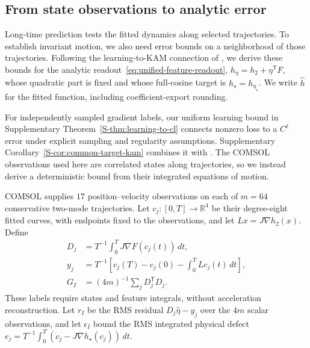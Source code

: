 \subsection{From state observations to analytic error}
\label{core-sec-learning-kam}
Long-time prediction tests the fitted dynamics along selected trajectories.
To establish invariant motion, we also need error bounds on a neighborhood
of those trajectories. Following the learning-to-KAM connection of
\citet[Theorem~11]{chen2022}, we derive these bounds for the analytic
readout~\eqref{eq:unified-feature-readout},
$h_\eta=h_2+\eta^{\mathsf T}F$, whose quadratic part is fixed and whose
full-cosine target is $h_\star=h_{\eta_\star}$. We write $\widehat h$ for
the fitted function, including coefficient-export rounding.

For independently sampled gradient labels, our uniform learning bound
in Supplementary Theorem~\ref{S-thm:learning-to-cl} connects nonzero loss
to a $C^\ell$ error under explicit sampling and regularity assumptions.
Supplementary Corollary~\ref{S-cor:common-target-kam} combines it with
\citet[Theorem~A]{bounemoura}. The COMSOL observations used here are
correlated states along trajectories, so we instead derive a deterministic
bound from their integrated equations of motion.

COMSOL supplies $17$ position--velocity observations on each of $m=64$
conservative two-mode trajectories. Let $c_j:[0,T]\to\mathbb R^4$ be
their degree-eight fitted curves, with endpoints fixed to the observations,
and let $Lx=J\nabla h_2(x)$. Define
\begin{equation}
 \begin{aligned}
  D_j&=T^{-1}\int_0^T J\nabla F(c_j(t))\,dt,\\
  y_j&=T^{-1}\left[c_j(T)-c_j(0)-\int_0^T Lc_j(t)\,dt\right],\\
  G_I&=(4m)^{-1}\sum_jD_j^{\mathsf T}D_j.
 \end{aligned}
 \label{core-eq-integral-design}
\end{equation}
These labels require states and feature integrals, without acceleration
reconstruction. Let $r_I$ be the RMS residual $D_j\widehat\eta-y_j$
over the $4m$ scalar observations, and let $\epsilon_I$ bound the RMS
integrated physical defect
$e_j=T^{-1}\int_0^T(\dot c_j-J\nabla h_\star(c_j))\,dt$.

